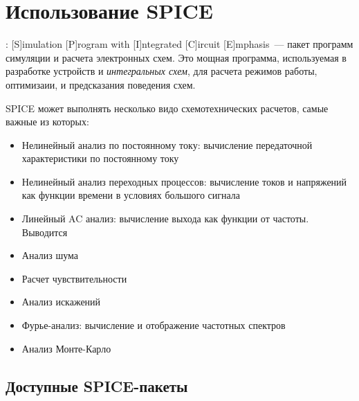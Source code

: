 
\chapter{Использование SPICE}

: [S]imulation [P]rogram with [I]ntegrated [C]ircuit
[E]mphasis\ --- пакет программ симуляции и расчета электронных схем.
Это мощная программа, используемая в разработке устройств и \emph{интегральных
схем}, для расчета режимов работы, оптимизаии, и предсказания поведения схем.

\bigskip
SPICE может выполнять несколько видо схемотехнических расчетов, самые важные
из которых:

\begin{itemize}
  \item
Нелинейный анализ по постоянному току: вычисление передаточной характеристики по
постоянному току
  \item 
Нелинейный анализ переходных процессов: вычисление токов и напряжений как
функции времени в условиях большого сигнала
  \item 
Линейный AC анализ: вычисление выхода как функции от частоты. Выводится
  \item 
Анализ шума 
  \item
Расчет чувствительности
  \item 
Анализ искажений 
  \item
Фурье-анализ: вычисление и отображение частотных спектров   
  \item 
Анализ Монте-Карло
\end{itemize}  

\section{Доступные SPICE-пакеты}

